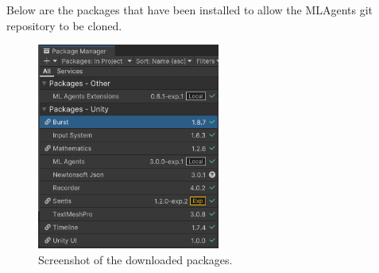 Below are the packages that have been installed to allow the MLAgents git repository to be cloned.

\begin{figure}[htb]
    \centering
    \includegraphics[width=6cm]{../Images/Update2/pkgs.png}
       \caption{Screenshot of the downloaded packages.}
           \label{Fig:Pkgs}
 \end{figure}

